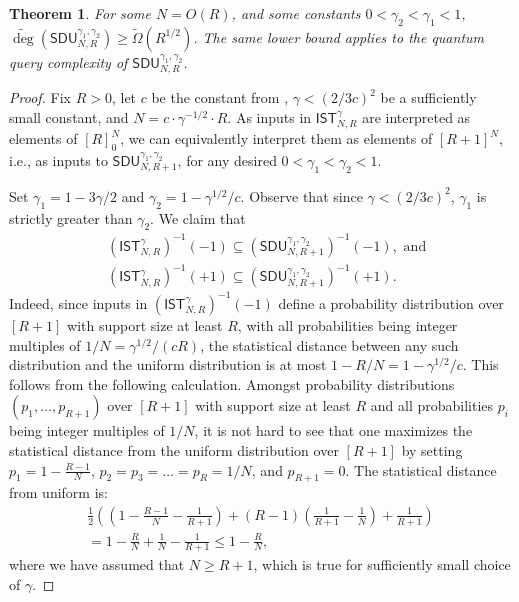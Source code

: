 \documentclass[11pt, letterpaper, fleqn]{article}
\newtheorem{theorem}{Theorem}
\theoremstyle{plain}
\newcommand{\SDU}{\mathsf{ SDU}}
\newcommand{\SE}{\mathsf{ IST}}
\newcommand{\tOmega}{\tilde{\Omega}}
\newcommand{\adeg}{\widetilde{\operatorname{deg}}}
\begin{document}
\begin{theorem} \label{sduthm}
 For some $N = O(R)$, and some constants $0 < \gamma_2 < \gamma_1 < 1$, $\adeg\left(\SDU_{N, R}^{\gamma_1, \gamma_2}\right) \ge \tOmega(R^{1/2})$.
 The same lower bound applies to the quantum query complexity of $\SDU_{N, R}^{\gamma_1, \gamma_2}$.
 \end{theorem}
\label{s:seimplications}
\begin{proof}
Fix $R >0$, let $c$ be the constant from ,
$\gamma<(2/3c)^2$ be a sufficiently small constant, and $N= c \cdot \gamma^{-1/2} \cdot R$. As inputs in $\SE_{N, R}^{\gamma}$ are interpreted as
elements of $[R]_0^N$, we can equivalently interpret them as elements of $[R+1]^N$,
i.e., as inputs to $\SDU_{N, R+1}^{\gamma_1, \gamma_2}$, for any desired $0 < \gamma_1 < \gamma_2 < 1$.

Set $\gamma_1 = 1-3\gamma/2$ and $\gamma_2=1-\gamma^{1/2}/c$.  
Observe that since $\gamma < (2/3c)^2$, $\gamma_1$ is strictly
greater than $\gamma_2$.
%
We claim that
\begin{align*} 
&\left(\SE_{N, R}^{\gamma}\right)^{-1}(-1) \subseteq \left(\SDU_{N, R+1}^{\gamma_1, \gamma_2}\right)^{-1}(-1), \text{ and} \\
&\left(\SE_{N, R}^{\gamma}\right)^{-1}(+1) \subseteq \left(\SDU_{N, R+1}^{\gamma_1, \gamma_2}\right)^{-1}(+1).
\end{align*}
Indeed, since inputs in $\left(\SE_{N, R}^{\gamma}\right)^{-1}(-1)$ define a probability distribution over $[R+1]$ with support size at least $R$, with all probabilities being integer multiples of $1/N=\gamma^{1/2}/(cR)$, the statistical distance between any such distribution and
the uniform distribution is at most $1-R/N = 1-\gamma^{1/2}/c$. This follows from the following calculation. 
Amongst probability distributions $(p_1, \dots, p_{R+1})$ over $[R+1]$ with support size at least $R$ and all probabilities $p_i$ being integer multiples of $1/N$,
it is not hard to see that one maximizes the statistical distance from the uniform distribution over $[R+1]$ by setting $p_1=1-\frac{R-1}{N}$, $p_2=p_3 = \dots = p_{R}=1/N$, and $p_{R+1}=0$. 
The statistical distance from uniform is: 
\begin{align*} 
\frac{1}{2} \left( \left(1-\frac{R-1}{N}-\frac{1}{R+1}\right) + \left(R-1\right)\left(\frac{1}{R+1} - \frac1N\right) + \frac{1}{R+1} \right)\\
= 1-\frac{R}{N} + \frac1N - \frac{1}{R+1} \leq 1-\frac{R}{N},
\end{align*}
where we have assumed that $N \geq R+1$, which is true for sufficiently small choice of $\gamma$.


\end{proof}
\end{document}
